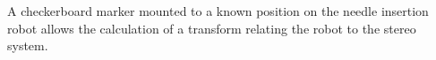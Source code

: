     A checkerboard marker mounted to a known position on the needle insertion robot allows the calculation of a transform relating the robot to the stereo system.
    
    


    

